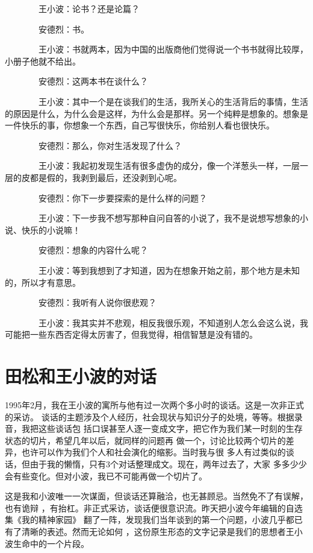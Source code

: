 　　　　王小波：论书？还是论篇？ 

　　　　安德烈：书。 

　　　　王小波：书就两本，因为中国的出版商他们觉得说一个书书就得比较厚，小册子他就不给出。 

　　　　安德烈：这两本书在谈什么？ 

　　　　王小波：其中一个是在谈我们的生活，我所关心的生活背后的事情，生活的原因是什么，为什么会是这样，为什么会是那样。另一个纯粹是想象的。想象是一件快乐的事，你想象一个东西，自己写很快乐，你给别人看也很快乐。 

　　　　安德烈：那么，你对生活发现了什么？ 

　　　　王小波：我起初发现生活有很多虚伪的成分，像一个洋葱头一样，一层一层的皮都是假的，我剥到最后，还没剥到心呢。 

　　　　安德烈：你下一步要探索的是什么样的问题？ 

　　　　王小波：下一步我不想写那种自问自答的小说了，我不是说想写想象的小说、快乐的小说嘛！ 

　　　　安德烈：想象的内容什么呢？ 

　　　　王小波：等到我想到了才知道，因为在想象开始之前，那个地方是未知的，所以才有意思。 

　　　　安德烈：我听有人说你很悲观？ 

　　　　王小波：我其实并不悲观，相反我很乐观，不知道别人怎么会这么说，我可能把一些东西否定得太厉害了，但我觉得，相信智慧是没有错的。

\chapter{田松和王小波的对话}

1995年2月，我在王小波的寓所与他有过一次两个多小时的谈话。这是一次非正式的采访。
谈话的主题涉及个人经历，社会现状与知识分子的处境，等等。根据录音，我把这些谈话包
括口误甚至人逐一变成文字，把它作为我们某一时刻的生存状态的切片，希望几年以后，就同样的问题再
做一个，讨论比较两个切片的差异，也许可以作为我们个人和社会演化的缩影。当时我与很
多人有过类似的谈话，但由于我的懒惰，只有3个对话整理成文。现在，两年过去了，大家
多多少少会有些变化。但对小波，我已不可能再做一个切片了。


这是我和小波唯一一次谋面，但谈话还算融洽，也无甚顾忌。当然免不了有误解，也有诡辩
，有抬杠。非正式采访，谈话便很意识流。昨天把小波今年编辑的自选集《我的精神家园》
翻了一阵，发现我们当年谈到的第一个问题，小波几乎都已有了清晰的表述。然而无论如何
，这份原生形态的文字记录是我们的思想者王小波生命中的一个片段。


